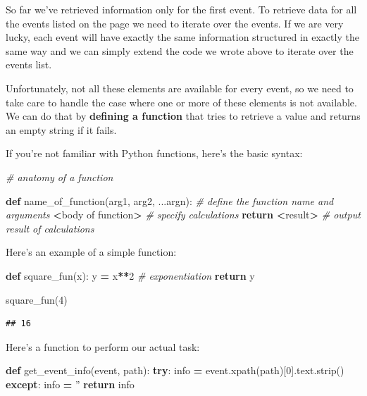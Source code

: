 \documentclass[]{book}
\newenvironment{Shaded}{\begin{snugshade}}{\end{snugshade}}
\newcommand{\CommentTok}[1]{\textcolor[rgb]{0.56,0.35,0.01}{\textit{#1}}}
\newcommand{\ControlFlowTok}[1]{\textcolor[rgb]{0.13,0.29,0.53}{\textbf{#1}}}
\newcommand{\DecValTok}[1]{\textcolor[rgb]{0.00,0.00,0.81}{#1}}
\newcommand{\KeywordTok}[1]{\textcolor[rgb]{0.13,0.29,0.53}{\textbf{#1}}}
\newcommand{\NormalTok}[1]{#1}
\newcommand{\OperatorTok}[1]{\textcolor[rgb]{0.81,0.36,0.00}{\textbf{#1}}}
\newcommand{\StringTok}[1]{\textcolor[rgb]{0.31,0.60,0.02}{#1}}
\begin{document}
So far we've retrieved information only for the first event. To
retrieve data for all the events listed on the page we need to iterate
over the events. If we are very lucky, each event will have exactly
the same information structured in exactly the same way and we can
simply extend the code we wrote above to iterate over the events list.

Unfortunately, not all these elements are available for every event, so
we need to take care to handle the case where one or more of these
elements is not available. We can do that by \textbf{defining a function} that
tries to retrieve a value and returns an empty string if it fails.

If you're not familiar with Python functions, here's the basic syntax:

\begin{Shaded}
\begin{Highlighting}[]
\CommentTok{# anatomy of a function}

\KeywordTok{def}\NormalTok{ name_of_function(arg1, arg2, ...argn):  }\CommentTok{# define the function name and arguments}
    \OperatorTok{<}\NormalTok{body of function}\OperatorTok{>}   \CommentTok{# specify calculations}
    \ControlFlowTok{return} \OperatorTok{<}\NormalTok{result}\OperatorTok{>}      \CommentTok{# output result of calculations}
\end{Highlighting}
\end{Shaded}

Here's an example of a simple function:

\begin{Shaded}
\begin{Highlighting}[]
\KeywordTok{def}\NormalTok{ square_fun(x):}
\NormalTok{    y }\OperatorTok{=}\NormalTok{ x}\OperatorTok{**}\DecValTok{2} \CommentTok{# exponentiation}
    \ControlFlowTok{return}\NormalTok{ y}

\NormalTok{square_fun(}\DecValTok{4}\NormalTok{)    }
\end{Highlighting}
\end{Shaded}

\begin{verbatim}
## 16
\end{verbatim}

Here's a function to perform our actual task:

\begin{Shaded}
\begin{Highlighting}[]
\KeywordTok{def}\NormalTok{ get_event_info(event, path):}
    \ControlFlowTok{try}\NormalTok{:}
\NormalTok{        info }\OperatorTok{=}\NormalTok{ event.xpath(path)[}\DecValTok{0}\NormalTok{].text.strip()}
    \ControlFlowTok{except}\NormalTok{:}
\NormalTok{        info }\OperatorTok{=} \StringTok{''}
    \ControlFlowTok{return}\NormalTok{ info}
\end{Highlighting}
\end{Shaded}
\end{document}
